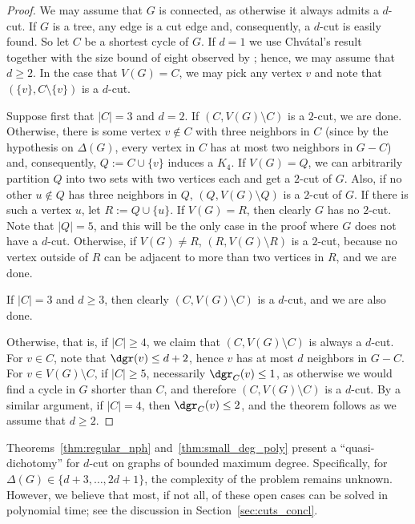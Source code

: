 \begin{proof}
    We may assume that $G$ is connected, as otherwise it always admits a $d$-cut. If $G$ is a tree, any edge is a cut edge and, consequently, a $d$-cut is easily found.
    So let $C$ be a shortest cycle of $G$.
    If $d = 1$ we use Chvátal's result~\citep{chvatal_matching_cut} together with the size bound of eight observed by \cite{matching_cut_moshi}; hence, we may assume that $d \geq 2$.
    In the case that $V(G) = C$, we may pick any vertex $v$ and note that $(\{v\}, C \setminus \{v\})$ is a $d$-cut.


     Suppose first that $|C| = 3$ and $d = 2$.  If $(C, V(G) \setminus C)$ is a $2$-cut, we are done. Otherwise, there is some vertex $v \notin C$ with three neighbors in $C$ (since by the hypothesis on $\Delta(G)$, every vertex in $C$ has at most two neighbors in $G - C$) and, consequently, $Q := C \cup \{v\}$ induces a $K_4$.
    If $V(G) = Q$, we can arbitrarily partition $Q$ into two sets with two vertices each and get a $2$-cut of $G$.
    Also, if no other $u \notin Q$ has three neighbors in $Q$, $(Q, V(G) \setminus Q)$ is a $2$-cut of $G$.
    If there is such a vertex $u$, let $R := Q \cup \{u\}$. If $V(G) = R$, then clearly $G$ has no $2$-cut. Note that $|Q|=5$, and this will be the only case in the proof where $G$ does not have a $d$-cut. Otherwise, if $V(G) \neq R$, $(R, V(G) \setminus R)$ is a $2$-cut, because no vertex outside of $R$ can be adjacent to more than two vertices in $R$, and we are done.

    If $|C| = 3$ and $d \geq 3$, then clearly $(C, V(G) \setminus C)$ is a $d$-cut, and we are also done.

    Otherwise, that is, if $|C| \geq 4$, we claim that $(C, V(G) \setminus C)$ is always a $d$-cut.
    For $v \in C$, note that $\dgr(v) \leq d + 2$, hence $v$ has at most $d$ neighbors in $G - C$. For $v \in V(G) \setminus C$, if $|C| \geq 5$, necessarily $\dgr_C(v) \leq 1$, as otherwise we would find a cycle in $G$ shorter than $C$, and therefore $(C, V(G) \setminus C)$ is a $d$-cut.
    By a similar argument, if $|C| = 4$, then $\dgr_C(v) \leq 2$, and the theorem follows as we assume that $d \geq 2$.
\end{proof}

Theorems~\ref{thm:regular_nph} and~\ref{thm:small_deg_poly} present a ``quasi-dichotomy'' for $d$-cut on graphs of bounded maximum degree.
Specifically, for $\Delta(G) \in \{d+3, \dots, 2d+1\}$, the complexity of the problem remains unknown.
However, we believe that most, if not all, of these open cases can be solved in polynomial time; see the discussion in Section~\ref{sec:cuts_concl}.



